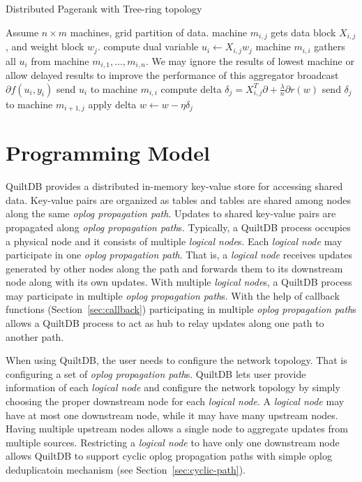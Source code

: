 \documentclass[11pt, twocolumn]{article}
\begin{document}
\begin{algorithm}[tb]
  \caption{Distributed Pagerank with Tree-ring topology}
  \label{algo:loss}
  \begin{algorithmic}[1]
    \REQUIRE Assume $n \times m$ machines, grid partition of data. machine
    $m_{i,j}$  gets data block $X_{i,j}$, and weight block $w_j$.
    \STATE compute dual variable $u_i \gets X_{i,j} w_j$
    \STATE machine $m_{i,i}$ gathers all $u_i$ from machine $m_{i,1}, \ldots,
    m_{i,n}$. We may ignore the results of lowest machine or allow delayed
    results to improve the performance of this aggregator
    \STATE broadcast $\partial f(u_i, y_i)$
    \ELSE
    \STATE send $u_i$ to machine $m_{i,i}$
    \ENDIF
    \STATE compute delta $\delta_j = X_{i,j}^T \partial +
    \frac{\lambda}{n} \partial r(w)$
    \STATE send $\delta_j$ to machine $m_{i+1,j}$
    \STATE apply delta $w \gets w - \eta \delta_j$
    \ENDFOR
    \ENDFOR
  \end{algorithmic}
\end{algorithm}

\section{Programming Model}

QuiltDB provides a distributed in-memory key-value store for accessing shared
data. Key-value pairs are organized as tables and tables are shared among
nodes along the same \emph{oplog propagation path}. Updates to shared key-value
pairs are propagated along \emph{oplog propagation path}s. Typically, a QuiltDB
process occupies a physical node and it
consists of multiple \emph{logical node}s. Each \emph{logical node} may
participate in one \emph{oplog propagation path}. That is, a \emph{logical node}
receives updates generated by other nodes along the path and forwards them to
its downstream node along with its own updates. With multiple \emph{logical
node}s, a QuiltDB process may participate in multiple \emph{oplog propagation
path}s. With the help of callback functions (Section~\ref{sec:callback})
participating in multiple \emph{oplog propagation path}s
allows a QuiltDB process to act as hub to relay updates along one path to
another path.

When using QuiltDB, the user needs to configure the network topology.
That is configuring a set of \emph{oplog propagation path}s. QuiltDB lets user 
provide information of each \emph{logical node} and configure the network 
topology by simply choosing
the proper downstream node for each \emph{logical node}. A \emph{logical node}
may have at most one downstream node, while it may have many upstream nodes.
Having multiple upstream nodes allows a single node to aggregate updates from
multiple sources. Restricting a \emph{logical node} to have only one downstream
node allows QuiltDB to support cyclic {oplog propagation path}s with simple
oplog deduplicatoin mechanism (see Section~\ref{sec:cyclic-path}).
\end{document}
